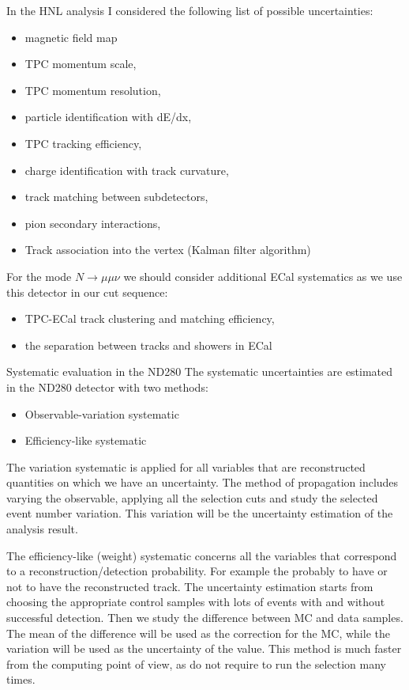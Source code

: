 \documentclass[../main.tex]{subfiles}
\begin{document}
In the HNL analysis I considered the following list of possible uncertainties:
\begin{itemize}
    \item magnetic field map
    \item TPC momentum scale,
    \item TPC momentum resolution,
    \item particle identification with dE/dx,
    \item TPC tracking efficiency,
    \item charge identification with track curvature,
    \item track matching between subdetectors,
    \item pion secondary interactions,
    \item Track association into the vertex (Kalman filter algorithm)
\end{itemize}

For the mode $N\to\mu\mu\nu$ we should consider additional ECal systematics as we use this detector in our cut sequence:

\begin{itemize}
    \item TPC-ECal track clustering and matching efficiency,
    \item the separation between tracks and showers in ECal
\end{itemize}

\begin{bclogo}[couleur=blue!2, arrondi=0.1, logo=\bcinfo, nobreak=true]{Systematic evaluation in the ND280}
    The systematic uncertainties are estimated in the ND280 detector with two methods:
    \begin{itemize}
        \item Observable-variation systematic
        \item Efficiency-like systematic
    \end{itemize}

    The variation systematic is applied for all variables that are reconstructed quantities on which we have an uncertainty. The method of propagation includes varying the observable, applying all the selection cuts and study the selected event number variation. This variation will be the uncertainty estimation of the analysis result.

    The efficiency-like (weight) systematic concerns all the variables that correspond to a reconstruction/detection probability. For example the probably to have or not to have the reconstructed track. The uncertainty estimation starts from choosing the appropriate control samples with lots of events with and without successful detection. Then we study the difference between MC and data samples. The mean of the difference will be used as the correction for the MC, while the variation will be used as the uncertainty of the value. This method is much faster from the computing point of view, as do not require to run the selection many times.
\end{bclogo}
\end{document}
